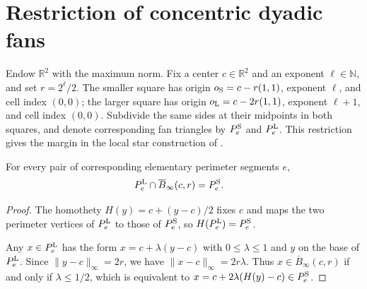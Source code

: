 \section{Restriction of concentric dyadic fans}
\label{sec:area_law_concentric_fans}

Endow $\mathbb R^2$ with the maximum norm. Fix a center
$c\in\mathbb R^2$ and an exponent $\ell\in\mathbb N$, and set $r=2^\ell/2$.
The smaller square has origin $o_{\rm S}=c-r(1,1)$, exponent $\ell$,
and cell index $(0,0)$; the larger square has origin
$o_{\rm L}=c-2r(1,1)$, exponent $\ell+1$, and cell index $(0,0)$.
Subdivide the same sides at their midpoints in both squares, and denote
corresponding fan triangles by $P_e^{\rm S}$ and $P_e^{\rm L}$.
This restriction gives the margin in the local star construction of
\cite[Section~11]{OpenAI2026AreaLaw}.


\begin{lemma}
    \label{thm:area_law_concentric_fan_restriction}
    \leanok
    For every pair of corresponding elementary perimeter segments $e$,
    \begin{align}
        P_e^{\rm L}\cap\overline B_\infty(c,r) & =P_e^{\rm S}.
    \end{align}
\end{lemma}
\begin{proof}\leanok
    The homothety $H(y)=c+(y-c)/2$ fixes $c$ and maps the two perimeter
    vertices of $P_e^{\rm L}$ to those of $P_e^{\rm S}$, so
    $H(P_e^{\rm L})=P_e^{\rm S}$.

    Any $x\in P_e^{\rm L}$ has the form $x=c+\lambda(y-c)$ with
    $0\le\lambda\le1$ and $y$ on the base of $P_e^{\rm L}$. Since
    $\|y-c\|_\infty=2r$, we have $\|x-c\|_\infty=2r\lambda$. Thus
    $x\in\overline B_\infty(c,r)$ if and only if $\lambda\le1/2$, which is
    equivalent to $x=c+2\lambda(H(y)-c)\in P_e^{\rm S}$.
\end{proof}
